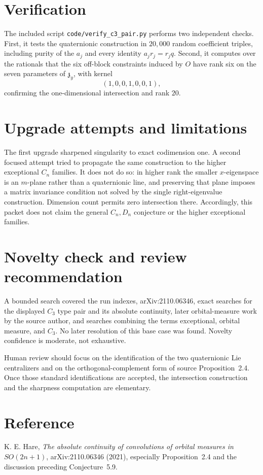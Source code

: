 \documentclass[11pt]{article}
\newcommand{\zz}{\mathfrak z}
\begin{document}
\section*{Verification}

The included script \texttt{code/verify\_c3\_pair.py} performs two independent
checks. First, it tests the quaternionic construction in \(20{,}000\)
random coefficient triples, including purity of the \(a_j\) and every
identity \(a_jr_j=r_jq\). Second, it computes over the rationals that the
six off-block constraints induced by \(O\) have rank six on the seven
parameters of \(\zz_y\), with kernel
\[
                         (1,0,0,1,0,0,1),
\]
confirming the one-dimensional intersection and rank \(20\).

\section*{Upgrade attempts and limitations}

The first upgrade sharpened singularity to exact codimension one.
A second focused attempt tried to propagate the same construction to the
higher exceptional \(C_n\) families. It does not do so: in higher rank the
smaller \(x\)-eigenspace is an \(m\)-plane rather than a quaternionic line,
and preserving that plane imposes a matrix invariance condition not solved
by the single right-eigenvalue construction. Dimension count permits zero
intersection there. Accordingly, this packet does not claim the general
\(C_n,D_n\) conjecture or the higher exceptional families.

\section*{Novelty check and review recommendation}

A bounded search covered the run indexes, arXiv:2110.06346, exact searches
for the displayed \(C_3\) type pair and its absolute continuity, later
orbital-measure work by the source author, and searches combining the terms
exceptional, orbital measure, and \(C_3\). No later resolution of this base
case was found. Novelty confidence is moderate, not exhaustive.

Human review should focus on the identification of the two quaternionic Lie
centralizers and on the orthogonal-complement form of source
Proposition~2.4. Once those standard identifications are accepted, the
intersection construction and the sharpness computation are elementary.

\section*{Reference}

\begin{sloppypar}
K. E. Hare, \emph{The absolute continuity of convolutions of orbital
measures in \(SO(2n+1)\)}, arXiv:2110.06346 (2021), especially
Proposition~2.4 and the discussion preceding Conjecture~5.9.
\end{sloppypar}
\end{document}
